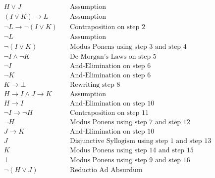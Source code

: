 \documentclass{math}
\begin{document}
\begin{align}
  H\vee J &\quad \text{Assumption} \\
  (I\vee K)\to L &\quad \text{Assumption} \\
  \neg L\to\neg(I\vee K) &\quad \text{Contraposition on step 2} \\
  \neg L &\quad \text{Assumption} \\
  \neg(I\vee K) &\quad \text{Modus Ponens using step 3 and step 4} \\
  \neg I\wedge\neg K &\quad \text{De Morgan's Laws on step 5} \\
  \neg I &\quad \text{And-Elimination on step 6} \\
  \neg K &\quad \text{And-Elimination on step 6} \\
  K\to\bot &\quad \text{Rewriting step 8} \\
  H\to I\wedge J\to K &\quad \text{Assumption} \\
  H\to I &\quad \text{And-Elimination on step 10} \\
  \neg I\to\neg H &\quad \text{Contraposition on step 11} \\
  \neg H &\quad \text{Modus Ponens using step 7 and step 12} \\
  J\to K &\quad \text{And-Elimination on step 10} \\
  J &\quad \text{Disjunctive Syllogism using step 1 and step 13} \\
  K &\quad \text{Modus Ponens using step 14 and step 15} \\
  \bot &\quad \text{Modus Ponens using step 9 and step 16} \\
  \neg(H\vee J) &\quad \text{Reductio Ad Absurdum}
\end{align}
\end{document}
